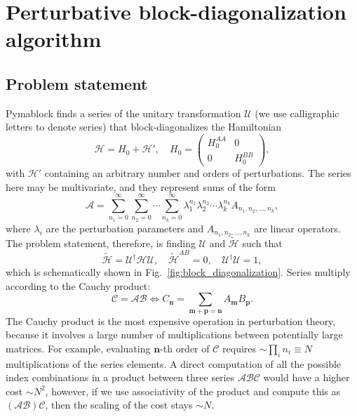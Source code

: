 \section{Perturbative block-diagonalization algorithm}

\subsection{Problem statement}

Pymablock finds a series of the unitary transformation $\mathcal{U}$ (we use calligraphic letters to denote series) that block-diagonalizes the Hamiltonian
%
\begin{equation}
\label{eq:hamiltonian}
\mathcal{H} = H_0 + \mathcal{H}',\quad H_0 = \begin{pmatrix}
H_0^{AA} & 0\\
0 & H_0^{BB}
\end{pmatrix},
\end{equation}
%
with $\mathcal{H}'$ containing an arbitrary number and orders of perturbations.
The series here may be multivariate, and they represent sums of the form
%
\begin{equation}
\mathcal{A} = \sum_{n_1=0}^\infty \sum_{n_2=0}^\infty \cdots \sum_{n_k=0}^\infty \lambda_1^{n_1} \lambda_2^{n_2} \cdots \lambda_k^{n_k} A_{n_1, n_2, \ldots, n_k},
\end{equation}
%
where $\lambda_i$ are the perturbation parameters and $A_{n_1, n_2, \ldots, n_k}$ are linear operators.
%
The problem statement, therefore, is finding $\mathcal{U}$ and $\tilde{\mathcal{H}}$ such that
%
\begin{equation}
\label{eq:problem_definition}
\tilde{\mathcal{H}} = \mathcal{U}^\dagger \mathcal{H} \mathcal{U},\quad \tilde{\mathcal{H}}^{AB} = 0,\quad \mathcal{U}^\dagger \mathcal{U} = 1,
\end{equation}
%
which is schematically shown in Fig.~\ref{fig:block_diagonalization}.
Series multiply according to the Cauchy product:
%
$$
\mathcal{C} = \mathcal{A}\mathcal{B} \Leftrightarrow C_\mathbf{n} = \sum_{\mathbf{m} + \mathbf{p} = \mathbf{n}} A_\mathbf{m} B_\mathbf{p}.
$$
%
The Cauchy product is the most expensive operation in perturbation theory, because it involves a large number of multiplications between potentially large matrices.
For example, evaluating $\mathbf{n}$-th order of $\mathcal{C}$ requires $\sim\prod_i n_i \equiv N$ multiplications of the series elements.
A direct computation of all the possible index combinations in a product between three series $\mathcal{A}\mathcal{B}\mathcal{C}$ would have a higher cost $\sim N^2$, however, if we use associativity of the product and compute this as $(\mathcal{A}\mathcal{B})\mathcal{C}$, then the scaling of the cost stays $\sim N$.

